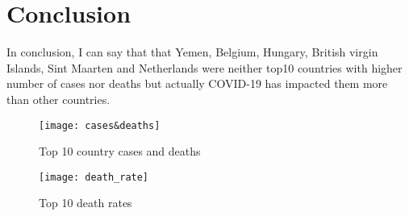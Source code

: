 \documentclass[12pt, letterpaper]{article}
\begin{document}
\section{Conclusion }

In conclusion, I can say that that Yemen, Belgium, Hungary, British virgin Islands, Sint Maarten and Netherlands were neither top10 countries with higher number of cases nor deaths but actually COVID-19 has impacted them more than other countries.  

 \begin{figure}[h]
    \centering
    \texttt{[image: cases\&deaths]}
    \caption{Top 10 country cases and deaths}
    \label{fig: cases&deaths}
\end{figure}


\begin{figure}[h]
    \centering
    \texttt{[image: death\_rate]}
    \caption{Top 10 death rates}
    \label{fig: death_rate}
\end{figure}
\end{document}
